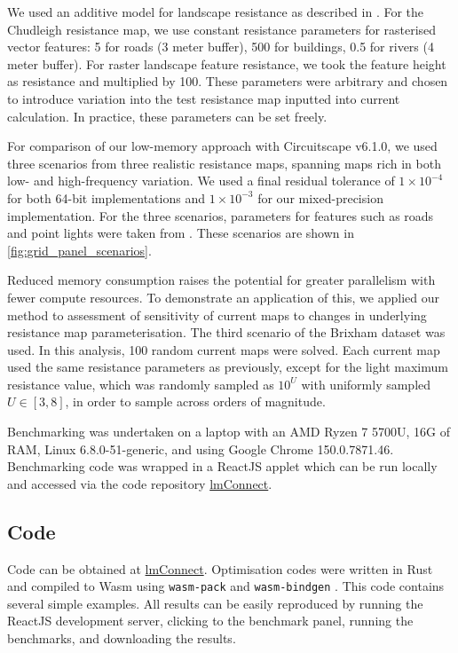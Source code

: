 \documentclass[11pt, a4paper]{article}
\begin{document}
We used an additive model for landscape resistance as described in \cite{finch2020modelling}.
For the Chudleigh resistance map, we use constant resistance parameters for rasterised vector features:
5 for roads (3 meter buffer), 500 for buildings, 0.5 for rivers (4 meter buffer).
For raster landscape feature resistance, we took the feature height as resistance and multiplied by 100. 
These parameters were arbitrary and chosen to introduce variation into the test resistance map inputted into current calculation.
In practice, these parameters can be set freely.

For comparison of our low-memory approach with Circuitscape v6.1.0, we used three scenarios from three realistic resistance maps, spanning 
maps rich in both low- and high-frequency variation. We used a final residual tolerance of $1\times10^{-4}$ for both 64-bit implementations 
and $1\times10^{-3}$ for our mixed-precision implementation.
For the three scenarios, parameters for features such as roads and point lights were taken from \cite{finch2020modelling}.
These scenarios are shown in \ref{fig:grid_panel_scenarios}.

Reduced memory consumption raises the potential for greater parallelism with fewer compute resources. 
To demonstrate an application of this, we applied our method to assessment of sensitivity of current maps to changes in underlying resistance map parameterisation. 
The third scenario of the Brixham dataset was used. In this analysis, 100 random current maps were solved. Each current map used
the same resistance parameters as previously, except for the light maximum resistance value, which was randomly sampled as $10^U$ with uniformly sampled $U \in [3, 8]$,
in order to sample across orders of magnitude.

Benchmarking was undertaken on a laptop with an AMD Ryzen 7 5700U, 16G of RAM, Linux 6.8.0-51-generic, and using Google Chrome 150.0.7871.46.
Benchmarking code was wrapped in a ReactJS \cite{reactjs} applet which can be run locally and accessed via the code repository
 \href{https://github.com/asouthgate/wasm-connectivity}{lmConnect}.

\subsection{Code}

Code can be obtained at \href{https://github.com/asouthgate/wasm-connectivity}{lmConnect}. Optimisation codes were written in Rust and compiled to Wasm using
\texttt{wasm-pack} \cite{wasm_pack_2024} and \texttt{wasm-bindgen} \cite{wasm_bindgen_2024}.
This code contains several simple examples. All results can be easily reproduced by running the ReactJS \cite{reactjs} development server, clicking to the benchmark panel, running the benchmarks, and downloading the results.
\end{document}
